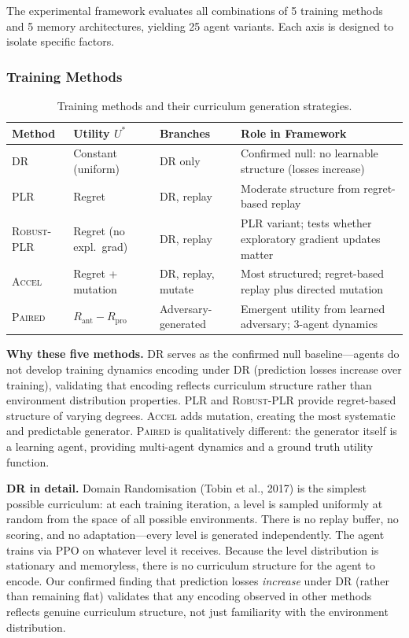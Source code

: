 \documentclass[11pt,a4paper]{article}
\theoremstyle{remark}
\newcommand{\paired}{\textsc{Paired}}
\newcommand{\accel}{\textsc{Accel}}
\newcommand{\plr}{\textsc{PLR}}
\newcommand{\dr}{\textsc{DR}}
\newcommand{\rplr}{\textsc{Robust-PLR}}
\newcommand{\Ustar}{U^*}
\newcommand{\Rpro}{R_{\text{pro}}}
\newcommand{\Rant}{R_{\text{ant}}}
\begin{document}
The experimental framework evaluates all combinations of 5 training methods and 5 memory architectures, yielding 25 agent variants. Each axis is designed to isolate specific factors.

\subsubsection{Training Methods}

\begin{table}[H]
\centering
\caption{Training methods and their curriculum generation strategies.}
\begin{tabularx}{\textwidth}{l >{\raggedright\arraybackslash}p{3cm} >{\raggedright\arraybackslash}p{2.8cm} X}
\toprule
\textbf{Method} & \textbf{Utility $\Ustar$} & \textbf{Branches} & \textbf{Role in Framework} \\
\midrule
\dr{} & Constant (uniform) & DR only & Confirmed null: no learnable structure (losses increase) \\
\plr{} & Regret & DR, replay & Moderate structure from regret-based replay \\
\rplr{} & Regret (no expl.\ grad) & DR, replay & \plr{} variant; tests whether exploratory gradient updates matter \\
\accel{} & Regret + mutation & DR, replay, mutate & Most structured; regret-based replay plus directed mutation \\
\paired{} & $\Rant - \Rpro$ & Adversary-generated & Emergent utility from learned adversary; 3-agent dynamics \\
\bottomrule
\end{tabularx}
\end{table}

\textbf{Why these five methods.} \dr{} serves as the confirmed null baseline---agents do not develop training dynamics encoding under \dr{} (prediction losses increase over training), validating that encoding reflects curriculum structure rather than environment distribution properties. \plr{} and \rplr{} provide regret-based structure of varying degrees. \accel{} adds mutation, creating the most systematic and predictable generator. \paired{} is qualitatively different: the generator itself is a learning agent, providing multi-agent dynamics and a ground truth utility function.

\textbf{\dr{} in detail.} Domain Randomisation (Tobin et al., 2017) is the simplest possible curriculum: at each training iteration, a level is sampled uniformly at random from the space of all possible environments. There is no replay buffer, no scoring, and no adaptation---every level is generated independently. The agent trains via PPO on whatever level it receives. Because the level distribution is stationary and memoryless, there is no curriculum structure for the agent to encode. Our confirmed finding that prediction losses \textit{increase} under \dr{} (rather than remaining flat) validates that any encoding observed in other methods reflects genuine curriculum structure, not just familiarity with the environment distribution.
\end{document}
